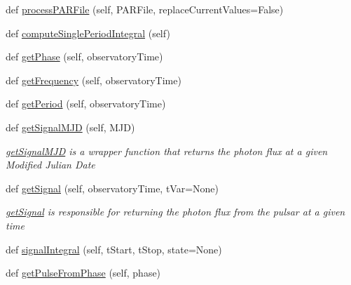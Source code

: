 \begin{DoxyCompactItemize}
\item 
def \hyperlink{classmodest_1_1signals_1_1periodicxraysource_1_1PeriodicXRaySource_a82addf4d6862423b3318da346cdb865e}{process\+P\+A\+R\+File} (self, P\+A\+R\+File, replace\+Current\+Values=False)
\item 
def \hyperlink{classmodest_1_1signals_1_1periodicxraysource_1_1PeriodicXRaySource_a3a07196809dc99abd81902fd7ed23eee}{compute\+Single\+Period\+Integral} (self)
\item 
def \hyperlink{classmodest_1_1signals_1_1periodicxraysource_1_1PeriodicXRaySource_aa1e5d06f2e4fd0908b7ba377162fa13f}{get\+Phase} (self, observatory\+Time)
\item 
def \hyperlink{classmodest_1_1signals_1_1periodicxraysource_1_1PeriodicXRaySource_a74531a4aacffcc59e47fda15793ede15}{get\+Frequency} (self, observatory\+Time)
\item 
def \hyperlink{classmodest_1_1signals_1_1periodicxraysource_1_1PeriodicXRaySource_a663b8e24a1d92b99a506a1b7e5535430}{get\+Period} (self, observatory\+Time)
\item 
def \hyperlink{classmodest_1_1signals_1_1periodicxraysource_1_1PeriodicXRaySource_a395746b94b58da20807c92633febffce}{get\+Signal\+M\+JD} (self, M\+JD)
\begin{DoxyCompactList}\small\item\em \hyperlink{classmodest_1_1signals_1_1periodicxraysource_1_1PeriodicXRaySource_a395746b94b58da20807c92633febffce}{get\+Signal\+M\+JD} is a wrapper function that returns the photon flux at a given Modified Julian Date \end{DoxyCompactList}\item 
def \hyperlink{classmodest_1_1signals_1_1periodicxraysource_1_1PeriodicXRaySource_a6cecf87c13cb6f104d9b7d45a3658fc8}{get\+Signal} (self, observatory\+Time, t\+Var=None)
\begin{DoxyCompactList}\small\item\em \hyperlink{classmodest_1_1signals_1_1periodicxraysource_1_1PeriodicXRaySource_a6cecf87c13cb6f104d9b7d45a3658fc8}{get\+Signal} is responsible for returning the photon flux from the pulsar at a given time \end{DoxyCompactList}\item 
def \hyperlink{classmodest_1_1signals_1_1periodicxraysource_1_1PeriodicXRaySource_ae933b6544c37c11a2298cb8fdd9d83a8}{signal\+Integral} (self, t\+Start, t\+Stop, state=None)
\item 
def \hyperlink{classmodest_1_1signals_1_1periodicxraysource_1_1PeriodicXRaySource_a0f4b278270d67daf1ecd3c1829de575f}{get\+Pulse\+From\+Phase} (self, phase)

\end{DoxyCompactItemize}
